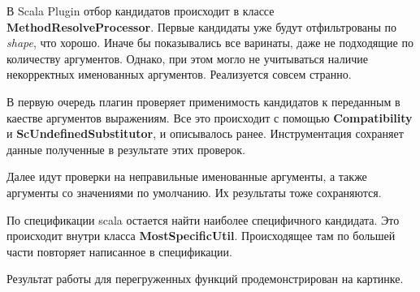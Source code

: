 В Scala Plugin отбор кандидатов происходит в классе
\textbf{MethodResolveProcessor}.
Первые кандидаты уже будут отфильтрованы по \textit{shape}, что хорошо.
Иначе бы показывались все варинаты, даже не подходящие по количеству аргументов.
Однако, при этом могло не учитываться наличие некорректных именованных аргументов.
Реализуется совсем странно.

В первую очередь плагин проверяет применимость кандидатов к переданным в
каестве аргументов выражениям.
Все это происходит с помощью \textbf{Compatibility} и
\textbf{ScUndefinedSubstitutor}, и описывалось ранее.
Инструментация сохраняет данные полученные в результате этих проверок.

Далее идут проверки на неправильные именованные аргументы,
а также аргументы со значениями по умолчанию.
Их результаты тоже сохраняются.

По спецификации scala остается найти наиболее специфичного кандидата.
Это происходит внутри класса \textbf{MostSpecificUtil}.
Происходящее там по большей части повторяет написанное в спецификации.

Результат работы для перегруженных функций продемонстрирован на картинке.
